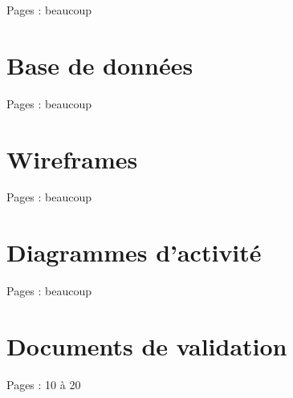 \documentclass{eplmastersthesis_FR}
\begin{document}
		Pages : beaucoup

	\chapter{Base de données}

		Pages : beaucoup

	\chapter{Wireframes}

		Pages : beaucoup

	\chapter{Diagrammes d'activité}

		Pages : beaucoup

	\chapter{Documents de validation}
		Pages : 10 à 20
	\setlength{\parskip}{0em}
	\backcoverpage
\end{document}
